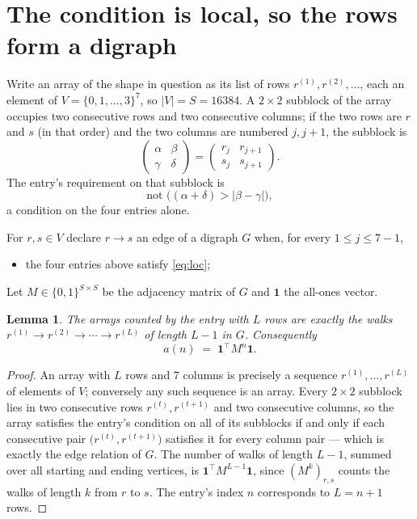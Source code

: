 \documentclass[11pt,a4paper]{article}
\theoremstyle{plain}
\newtheorem{lemma}[theorem]{Lemma}
\theoremstyle{definition}
\begin{document}
\section{The condition is local, so the rows form a digraph}

Write an array of the shape in question as its list of rows
$r^{(1)},r^{(2)},\dots$, each an element of
$V=\{0,1,\dots,3\}^{7}$, so $|V|=S=16384$. A $2\times2$ subblock of the array
occupies two consecutive rows and two consecutive columns; if the two rows are $r$
and $s$ (in that order) and the two columns are numbered $j,j+1$,
the subblock is
\[
\begin{pmatrix}\alpha&\beta\\\gamma&\delta\end{pmatrix}=\begin{pmatrix}r_j&r_{j+1}\\s_j&s_{j+1}\end{pmatrix}.
\]
The entry's requirement on that subblock is
\begin{equation}\label{eq:loc}
\text{not }\bigl((\alpha+\delta)>|\beta-\gamma|\bigr),
\end{equation}
a condition on the four entries alone.

For $r,s\in V$ declare $r\to s$ an edge of a digraph $G$ when, for every
$1\le j\le 7-1$,
\begin{itemize}
\item the four entries above satisfy \eqref{eq:loc};

\end{itemize}
Let $M\in\{0,1\}^{S\times S}$ be the adjacency matrix of $G$ and $\mathbf{1}$ the
all-ones vector.

\begin{lemma}\label{lem:walk}
The arrays counted by the entry with $L$ rows are exactly the walks
$r^{(1)}\to r^{(2)}\to\cdots\to r^{(L)}$ of length $L-1$ in $G$. Consequently
\[
a(n)\;=\;\mathbf{1}^{\!\top}M^{n}\mathbf{1} .
\]
\end{lemma}

\begin{proof}
An array with $L$ rows and $7$ columns is precisely a sequence
$r^{(1)},\dots,r^{(L)}$ of elements of $V$; conversely any such sequence is an array.
Every $2\times2$ subblock lies in two consecutive rows $r^{(t)},r^{(t+1)}$ and two
consecutive columns, so the array satisfies the entry's condition on all of its subblocks
if and only if each consecutive pair $\bigl(r^{(t)},r^{(t+1)}\bigr)$ satisfies it for
every column pair --- which is exactly the edge relation of $G$. The number of walks of
length $L-1$, summed over all starting and ending vertices, is
$\mathbf{1}^{\!\top}M^{L-1}\mathbf{1}$, since $(M^{k})_{r,s}$ counts the walks of
length $k$ from $r$ to $s$. The entry's index $n$ corresponds to $L=n+1$ rows.
\end{proof}
\end{document}
